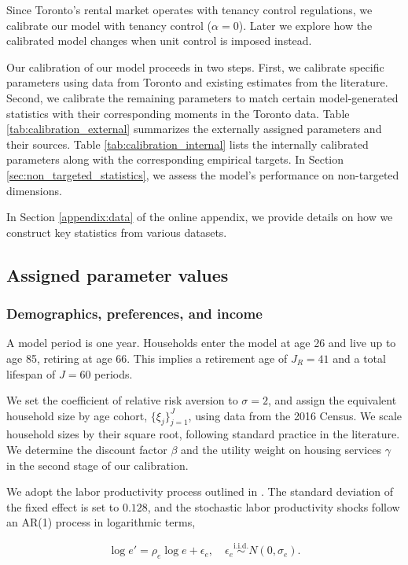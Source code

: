 \documentclass[parskip=full]{article}
\begin{document}
Since Toronto's rental market operates with tenancy control regulations, we calibrate our model with tenancy control ($\alpha=0$). Later we explore how the calibrated model changes when unit control is imposed instead.

Our calibration of our model proceeds in two steps. First, we calibrate specific parameters using data from Toronto and existing estimates from the literature. Second, we calibrate the remaining parameters to match certain model-generated statistics with their corresponding moments in the Toronto data. Table \ref{tab:calibration_external} summarizes the externally assigned parameters and their sources. Table \ref{tab:calibration_internal} lists the internally calibrated parameters along with the corresponding empirical targets. In Section \ref{sec:non_targeted_statistics}, we assess the model's performance on non-targeted dimensions.

In Section \ref{appendix:data} of the online appendix, we provide details on how we construct key statistics from various datasets. 

\subsection{Assigned parameter values}

\subsubsection{Demographics, preferences, and income}
A model period is one year. Households enter the model at age 26 and live up to age 85, retiring at age 66. This implies a retirement age of $J_{R}=41$ and a total lifespan of $J=60$ periods. 

We set the coefficient of relative risk aversion to $\sigma=2$, and assign the equivalent household size by age cohort, $\{\xi_{j}\}_{j=1}^{J}$, using data from the 2016 Census. We scale household sizes by their square root, following standard practice in the literature. We determine the discount factor $\beta$ and the utility weight on housing services $\gamma$ in the second stage of our calibration.

We adopt the labor productivity process outlined in \citet{gkkoc}. The standard deviation of the fixed effect is set to $0.128$, and the stochastic labor productivity shocks follow an AR(1) process in logarithmic terms,

\begin{equation*}
  \log e' = \rho_{e} \log e + \epsilon_{e},\quad \epsilon_{e}\overset{\mathrm{i.i.d.}} \sim N(0,\sigma_{e}).
\end{equation*}
\end{document}

